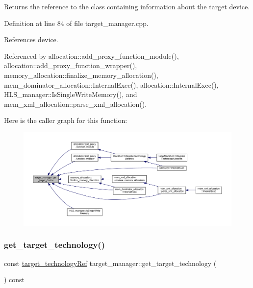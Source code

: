 Returns the reference to the class containing information about the target device. 



Definition at line 84 of file target\+\_\+manager.\+cpp.



References device.



Referenced by allocation\+::add\+\_\+proxy\+\_\+function\+\_\+module(), allocation\+::add\+\_\+proxy\+\_\+function\+\_\+wrapper(), memory\+\_\+allocation\+::finalize\+\_\+memory\+\_\+allocation(), mem\+\_\+dominator\+\_\+allocation\+::\+Internal\+Exec(), allocation\+::\+Internal\+Exec(), H\+L\+S\+\_\+manager\+::\+Is\+Single\+Write\+Memory(), and mem\+\_\+xml\+\_\+allocation\+::parse\+\_\+xml\+\_\+allocation().

Here is the caller graph for this function\+:
\nopagebreak
\begin{figure}[H]
\begin{center}
\leavevmode
\includegraphics[width=350pt]{da/d43/classtarget__manager_a3e45c4d4d04291c6b30b9a9219a891f1_icgraph}
\end{center}
\end{figure}
\mbox{\label{classtarget__manager_adc6562164208d0908e6eedd2a9655057}} 
\subsubsection{\texorpdfstring{get\+\_\+target\+\_\+technology()}{get\_target\_technology()}}
{\footnotesize\ttfamily const \hyperlink{target__technology_8hpp_a16af97aadc4eb998c2c9ec7fba5ccecd}{target\+\_\+technology\+Ref} target\+\_\+manager\+::get\+\_\+target\+\_\+technology (\begin{DoxyParamCaption}{ }\end{DoxyParamCaption}) const}



